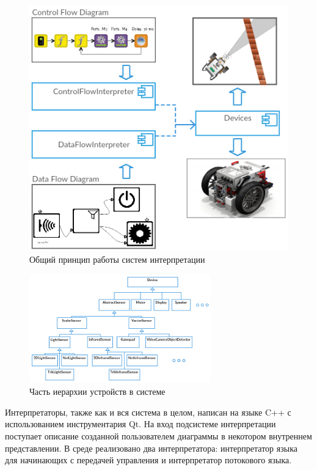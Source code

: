 \documentclass[conference]{IEEEtran}
\begin{document}
\begin{figure}[ht]
    \centering
    \includegraphics[width=0.9\columnwidth]{TS_Interpreter_Architecture.png}
    \caption{Общий принцип работы систем интерпретации}
    \label{image:interpretersTSArch}
\end{figure}

\begin{figure}[ht]
    \centering
    \includegraphics[width=0.7\textwidth]{TS_Devices_Architecture.png}
    \caption{Часть иерархии устройств в системе}
    \label{image:devicesTSArch}
\end{figure}

Интерпретаторы, также как и вся система в целом, написан на языке C++ с использованием инструментария Qt. На вход подсистеме интерпретации поступает
описание созданной пользователем диаграммы в некотором внутреннем представлении. В среде реализовано два интерпретатора: интерпретатор языка для начинающих с передачей управления и интерпретатор потокового языка.
\end{document}

